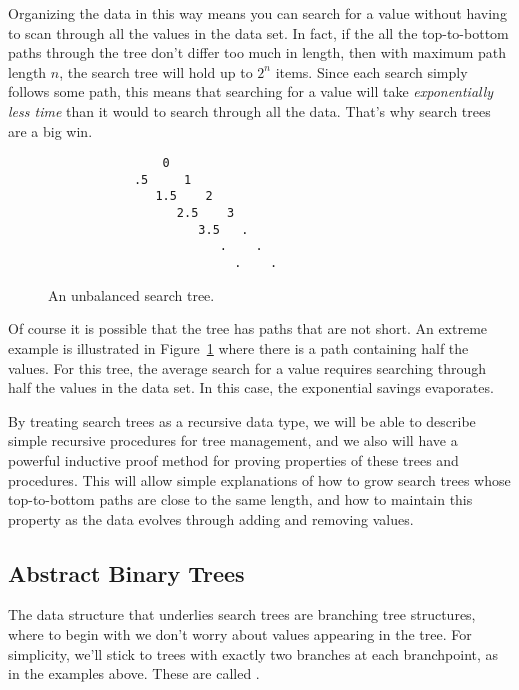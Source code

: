 Organizing the data in this way means you can search for a value
without having to scan through all the values in the data set.  In
fact, if the all the top-to-bottom paths through the tree don't differ
too much in length, then with maximum path length $n$, the search tree
will hold up to $2^n$ items.  Since each search simply follows some
path, this means that searching for a value will take
\emph{exponentially less time} than it would to search through all the
data.  That's why search trees are a big win.

\begin{figure}


\begin{verbatim}
                0
            .5     1
               1.5    2
                  2.5    3
                     3.5   .
                        .    .
                          .    .
\end{verbatim}   

\caption{An unbalanced search tree.}

\label{unbalanced}

\end{figure}

Of course it is possible that the tree has paths that are not short.
An extreme example is illustrated in Figure~\ref{unbalanced} where
there is a path containing half the values.  For this tree, the
average search for a value requires searching through half the values
in the data set.  In this case, the exponential savings evaporates.

By treating search trees as a recursive data type, we will be able to
describe simple recursive procedures for tree management, and we also
will have a powerful inductive proof method for proving properties of
these trees and procedures.  This will allow simple explanations of
how to grow search trees whose top-to-bottom paths are close to the
same length, and how to maintain this property as the data evolves
through adding and removing values.

\subsection{Abstract Binary Trees}

The data structure that underlies search trees are branching tree
structures, where to begin with we don't worry about values appearing
in the tree.  For simplicity, we'll stick to trees with exactly two
branches at each branchpoint, as in the examples above.  These are
called .


